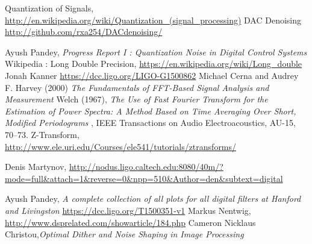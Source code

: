 \documentclass[a4paper,12pt]{article}
\begin{document}
\begin{thebibliography}{100}
 Quantization of Signals, \url{http://en.wikipedia.org/wiki/Quantization_(signal_processing)}
 DAC Denoising \url{http://github.com/rxa254/DACdenoising/}

 Ayush Pandey, \emph{Progress Report I : Quantization Noise in Digital Control Systems} 
 Wikipedia : Long Double Precision, \url{https://en.wikipedia.org/wiki/Long_double}
 Jonah Kanner \url{https://dcc.ligo.org/LIGO-G1500862}
 Michael Cerna and Audrey F. Harvey (2000) \emph{The Fundamentals of FFT-Based Signal Analysis and Measurement}
 Welch (1967),  \emph{The Use of Fast Fourier Transform for the Estimation of Power Spectra: A Method Based on Time Averaging Over Short, Modified Periodograms} , IEEE Transactions on Audio Electroacoustics, AU-15, 70–73.
 Z-Transform, \url{http://www.ele.uri.edu/Courses/ele541/tutorials/ztransforms/}

 Denis Martynov, \url{http://nodus.ligo.caltech.edu:8080/40m/?mode=full&attach=1&reverse=0&npp=510&Author=den&subtext=digital}  



 Ayush Pandey, \emph{A complete collection of all plots for all digital filters at Hanford and Livingston}
\url{https://dcc.ligo.org/T1500351-v1}
 Markus Nentwig, \url{http://www.dsprelated.com/showarticle/184.php}
Cameron Nicklaus Christou,\emph{Optimal Dither and Noise Shaping in Image Processing}
\end{thebibliography}      
\printbibliography
\end{document}
